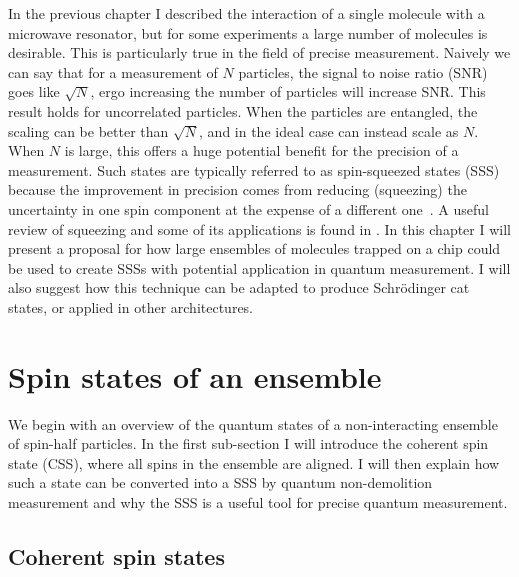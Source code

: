 In the previous chapter I described the interaction of a single molecule with a
microwave resonator, but for some experiments a large number of molecules is
desirable. This is particularly true in the field of precise measurement.
Naively we can say that for a measurement of $N$ particles, the signal to
noise ratio (SNR) goes like $\sqrt{N}$, ergo increasing the number of particles
will increase SNR.
%
This result holds for uncorrelated particles. When the particles are entangled,
the scaling can be better than $\sqrt{N}$, and in the ideal case can instead
scale as $N$. When $N$ is large, this offers a huge potential benefit for the
precision of a measurement. Such states are typically referred to as
spin-squeezed states (SSS) because the improvement in precision comes from
reducing (squeezing) the uncertainty in one spin component at the expense of a
different one~\cite{PhysRevA.47.3554, PhysRevA.47.5138}. A useful review of
squeezing and some of its applications is found in .
%
In this chapter I will present a proposal for how large ensembles of \CaF{}
molecules trapped on a chip could be used to create SSSs with potential
application in quantum measurement. I will also suggest how this technique can
be adapted to produce Schr\"odinger cat states, or applied in other
architectures.

\section{Spin states of an ensemble}

We begin with an overview of the quantum states of a non-interacting ensemble
of spin-half particles. In the first sub-section I will introduce the coherent
spin state (CSS), where all spins in the ensemble are aligned. I will then
explain how such a state can be converted into a SSS by quantum non-demolition
measurement and why the SSS is a useful tool for precise quantum measurement.

\subsection{Coherent spin states}

